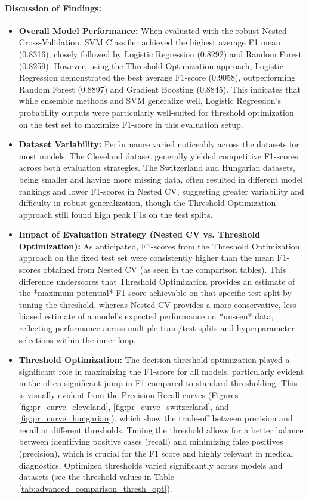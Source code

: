 \documentclass{article}
\begin{document}
\paragraph{Discussion of Findings:}
\begin{itemize}
    \item \textbf{Overall Model Performance:} When evaluated with the robust Nested Cross-Validation, SVM Classifier achieved the highest average F1 mean (0.8316), closely followed by Logistic Regression (0.8292) and Random Forest (0.8259). However, using the Threshold Optimization approach, Logistic Regression demonstrated the best average F1-score (0.9058), outperforming Random Forest (0.8897) and Gradient Boosting (0.8845). This indicates that while ensemble methods and SVM generalize well, Logistic Regression's probability outputs were particularly well-suited for threshold optimization on the test set to maximize F1-score in this evaluation setup.
    \item \textbf{Dataset Variability:} Performance varied noticeably across the datasets for most models. The Cleveland dataset generally yielded competitive F1-scores across both evaluation strategies. The Switzerland and Hungarian datasets, being smaller and having more missing data, often resulted in different model rankings and lower F1-scores in Nested CV, suggesting greater variability and difficulty in robust generalization, though the Threshold Optimization approach still found high peak F1s on the test splits.
    \item \textbf{Impact of Evaluation Strategy (Nested CV vs. Threshold Optimization):} As anticipated, F1-scores from the Threshold Optimization approach on the fixed test set were consistently higher than the mean F1-scores obtained from Nested CV (as seen in the comparison tables). This difference underscores that Threshold Optimization provides an estimate of the *maximum potential* F1-score achievable on that specific test split by tuning the threshold, whereas Nested CV provides a more conservative, less biased estimate of a model's expected performance on *unseen* data, reflecting performance across multiple train/test splits and hyperparameter selections within the inner loop.
    \item \textbf{Threshold Optimization:} The decision threshold optimization played a significant role in maximizing the F1-score for all models, particularly evident in the often significant jump in F1 compared to standard thresholding. This is visually evident from the Precision-Recall curves (Figures \ref{fig:pr_curve_cleveland}, \ref{fig:pr_curve_switzerland}, and \ref{fig:pr_curve_hungarian}), which show the trade-off between precision and recall at different thresholds. Tuning the threshold allows for a better balance between identifying positive cases (recall) and minimizing false positives (precision), which is crucial for the F1 score and highly relevant in medical diagnostics. Optimized thresholds varied significantly across models and datasets (see the threshold values in Table \ref{tab:advanced_comparison_thresh_opt}).

\end{itemize}
\end{document}
